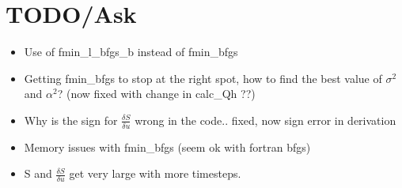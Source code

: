\documentclass[a4paper, 12pt]{article}
\newcommand{\vv}[2]{\frac{\delta #1}{\delta #2}}
\begin{document}
\section{TODO/Ask}
\begin{itemize}
\item Use of fmin\_l\_bfgs\_b instead of fmin\_bfgs
\item Getting fmin\_bfgs to stop at the right spot, how to find the best value of $\sigma^2$ and $\alpha^2$? (now fixed with change in calc\_Qh ??)
\item Why is the sign for $\frac{\delta S}{\delta u}$ wrong in the code.. fixed, now sign error in derivation
\item Memory issues with fmin\_bfgs (seem ok with fortran bfgs)
\item S and $\vv{S}{u}$ get very large with more timesteps.
\end{itemize}


\newpage
{}

{}
\end{document}
